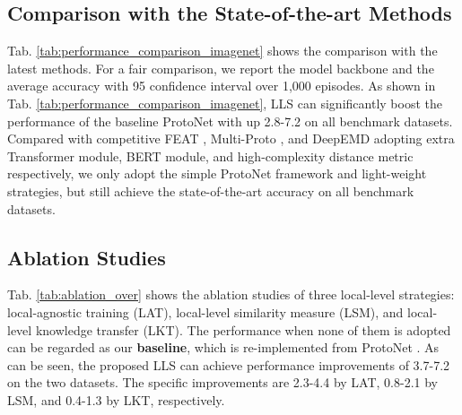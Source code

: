 \documentclass{article}
\begin{document}
\subsection{Comparison with the State-of-the-art Methods}
\label{sec:SOTA}
Tab. \ref{tab:performance_comparison_imagenet} shows the comparison with the latest methods. For a fair comparison, we report the model backbone and the average accuracy with 95 confidence interval over 1,000 episodes. As shown in Tab. \ref{tab:performance_comparison_imagenet}, LLS can significantly boost the performance of the baseline ProtoNet with up 2.8-7.2 on all benchmark datasets. Compared with competitive FEAT \cite{ye2020set}, Multi-Proto \cite{multi-pro}, and DeepEMD \cite{zhang2020deepemd} adopting extra Transformer module, BERT module, and high-complexity distance metric respectively, we only adopt the simple ProtoNet framework and light-weight strategies, but still achieve the state-of-the-art accuracy on all benchmark datasets. 



\subsection{Ablation Studies}
\label{sec:ablation}
Tab. \ref{tab:ablation_over} shows the ablation studies of three local-level strategies: local-agnostic training (LAT), local-level similarity measure (LSM), and local-level knowledge transfer (LKT). The performance when none of them is adopted can be regarded as our \textbf{baseline}, which is re-implemented from ProtoNet \cite{snell2017prototypical}. As can be seen, the proposed LLS can achieve performance improvements of 3.7-7.2 on the two datasets. The specific improvements are 2.3-4.4 by LAT, 0.8-2.1 by LSM, and 0.4-1.3 by LKT, respectively.
\end{document}
